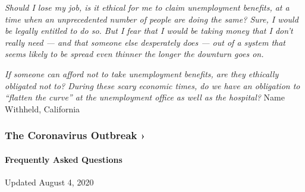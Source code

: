 \emph{Should I lose my job, is it ethical for me to claim unemployment
benefits, at a time when an unprecedented number of people are doing the
same? Sure, I would be legally entitled to do so. But I fear that I
would be taking money that I don't really need --- and that someone else
desperately does --- out of a system that seems likely to be spread even
thinner the longer the downturn goes on.}

\emph{If someone can afford not to take unemployment benefits, are they
ethically obligated not to? During these scary economic times, do we
have an obligation to ``flatten the curve'' at the unemployment office
as well as the hospital?} Name Withheld, California

\href{https://www.nytimes.com/news-event/coronavirus?action=click\&pgtype=Article\&state=default\&region=MAIN_CONTENT_3\&context=storylines_faq}{}

\hypertarget{the-coronavirus-outbreak-}{%
\subsubsection{The Coronavirus Outbreak
›}\label{the-coronavirus-outbreak-}}

\hypertarget{frequently-asked-questions}{%
\paragraph{Frequently Asked
Questions}\label{frequently-asked-questions}}

Updated August 4, 2020

